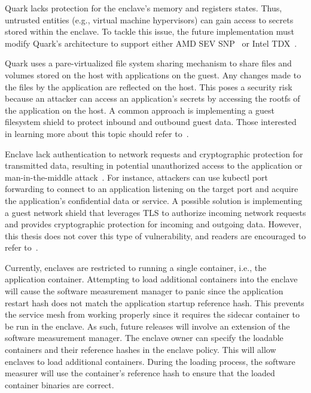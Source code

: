 Quark lacks protection for the enclave's memory and registers states. Thus, untrusted entities (e.g., virtual machine hypervisors) can gain access to secrets stored within the enclave. To tackle this issue, the future implementation must modify Quark's architecture to support either AMD SEV SNP~\cite*{SEV_SNP_white_book} 
or Intel TDX~\cite*{Intel_tdx_whitepaper}.

Quark uses a pare-virtualized file system sharing mechanism to share files and volumes stored on the host with applications on the guest. Any changes made to the files by the application are reflected on the host. This poses a security risk because an attacker can access an application's secrets by 
accessing the rootfs of the application on the host. A common approach is implementing a guest filesystem shield to protect inbound and outbound guest data. Those interested in learning more about this topic should refer to~\cite*{file_system_shield}.

Enclave lack authentication to network requests and cryptographic protection for transmitted data, resulting in potential unauthorized access to the application or man-in-the-middle attack~\cite*{Man_in_the_middle_attack}. For instance, attackers can use kubectl port forwarding to connect to an 
application listening on the target port and acquire the application's confidential data or service. A possible solution is implementing a guest network shield that leverages TLS to authorize incoming network requests and provides cryptographic protection for incoming and outgoing data. However, this thesis does not cover this 
type of vulnerability, and readers are encouraged to refer to~\cite*{network_shiled}.

Currently, enclaves are restricted to running a single container, i.e., the application container. Attempting to load additional containers into the enclave will cause the software measurement manager to panic since the application restart hash does not match the application startup reference hash. 
This prevents the service mesh from working properly since it requires the sidecar container to be run in the enclave. As such,  future releases will involve an extension of the software measurement manager. The enclave owner can specify the loadable containers and their reference hashes in the 
enclave policy. This will allow enclaves to load additional containers. During the loading process, the software measurer will use the container's reference hash to ensure that the loaded container binaries are correct.


